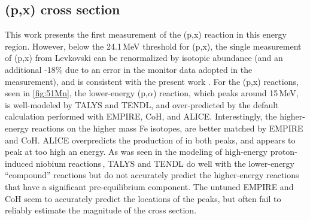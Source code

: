 % 






\subsection{(p,x) cross section}

This work presents the first measurement of the (p,x) reaction in this energy region.
However, below the 24.1\,MeV threshold for (p,x), the single measurement of (p,x) from Levkovski can be renormalized by isotopic abundance (and an additional -18\% due to an error in the monitor data adopted in the measurement), and is consistent  with the present work \cite{levkovski1991cross}.
For the (p,x) reactions, seen in \autoref{fig:51Mn}, the lower-energy  (p,$\alpha$) reaction, which peaks around 15\,MeV, is  well-modeled by TALYS and TENDL, and over-predicted by the default calculation performed with  EMPIRE, CoH, and ALICE.
Interestingly, the higher-energy reactions on the higher mass Fe isotopes, are better matched by  EMPIRE and CoH.
ALICE overpredicts the production of  in both peaks, and appears to peak at too high an energy.
As was seen in the modeling of high-energy proton-induced niobium reactions\,\cite{Voyles2018a}, TALYS and TENDL do well with the lower-energy \enquote{compound} reactions but do not accurately predict the higher-energy reactions that have a significant pre-equilibrium component.
The untuned EMPIRE and CoH seem to accurately predict the locations of the peaks, but often fail to reliably estimate the magnitude of the cross section.

